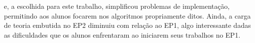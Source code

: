 \documentclass[brazil,times]{abnt}
\begin{document}
e, a escolhida para este trabalho, simplificou problemas de implementação, permitindo aos alunos focarem nos algoritmos propriamente ditos. Ainda, a carga de teoria embutida no EP2 diminuiu com relação ao EP1, algo interessante dadas as dificuldades que os alunos enfrentaram ao iniciarem seus trabalhos no EP1.
	
%
%
\end{document}
